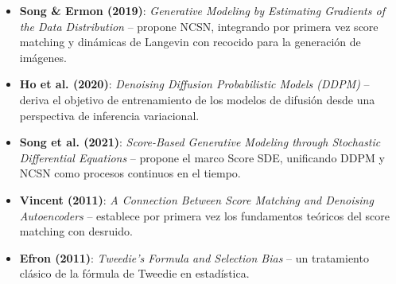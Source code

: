 \documentclass[a4paper]{article}
\begin{document}
\begin{itemize}
    \item \textbf{Song \& Ermon (2019)}: \textit{Generative Modeling by Estimating Gradients of the Data Distribution} -- propone NCSN, integrando por primera vez score matching y dinámicas de Langevin con recocido para la generación de imágenes.
    \item \textbf{Ho et al. (2020)}: \textit{Denoising Diffusion Probabilistic Models (DDPM)} -- deriva el objetivo de entrenamiento de los modelos de difusión desde una perspectiva de inferencia variacional.
    \item \textbf{Song et al. (2021)}: \textit{Score-Based Generative Modeling through Stochastic Differential Equations} -- propone el marco Score SDE, unificando DDPM y NCSN como procesos continuos en el tiempo.
    \item \textbf{Vincent (2011)}: \textit{A Connection Between Score Matching and Denoising Autoencoders} -- establece por primera vez los fundamentos teóricos del score matching con desruido.
    \item \textbf{Efron (2011)}: \textit{Tweedie's Formula and Selection Bias} -- un tratamiento clásico de la fórmula de Tweedie en estadística.
\end{itemize}

\end{document}
